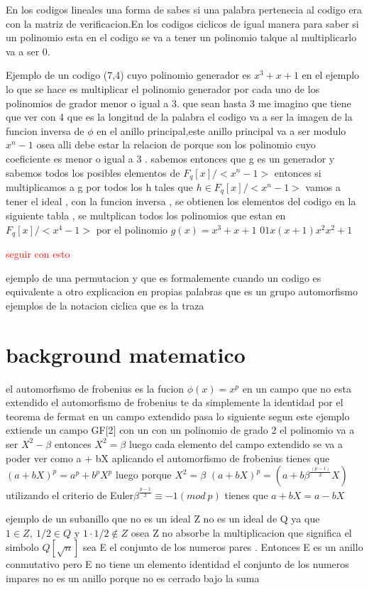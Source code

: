 \documentclass[12p]{article}
\newcommand{\rojo}[1]{
  \textcolor{red}{#1}
}
\begin{document}
En los codigos lineales una forma de sabes si una palabra pertenecia al codigo era con la matriz de 
verificacion.En los codigos ciclicos de igual manera para saber si un polinomio esta en el codigo 
se va a tener un polinomio talque al multiplicarlo va a ser 0.

Ejemplo de un codigo (7,4) cuyo polinomio generador es $x^3 + x + 1$
en el ejemplo lo que se hace es multiplicar el polinomio generador por cada uno de los polinomios de grador menor o igual a 3.
que sean hasta 3 me imagino que tiene que ver con 4 que es la longitud de la palabra
el codigo va a ser la imagen de la funcion inversa de $\phi$ en el anillo principal,este anillo principal va a ser modulo $x^ n - 1$
osea alli debe estar la relacion de porque son los polinomio cuyo coeficiente es menor o igual a 3 .
sabemos entonces que g es un generador y sabemos todos los posibles elementos de $F_q[x]/<x^ n -1>$ entonces si multiplicamos a
g por todos los h tales que $h \in F _ q[x]/<x^ n - 1>$ vamos a tener el ideal , con la funcion inversa , se obtienen los elementos del codigo
en la siguiente tabla , se multplican todos los polinomios que estan en $F_q[x]/<x^ 4 - 1>$ por el polinomio $g(x) = x ^ 3 + x + 1$
$0
1
x
(x + 1)
x^2
x^ 2 + 1$
\rojo{seguir con esto}

ejemplo de una permutacion y que es formalemente
cuando un codigo es equivalente a otro
explicacion en propias palabras que es un grupo automorfismo
ejemplos de la notacion ciclica
que es la traza 
\section{background matematico}
el automorfismo de frobenius es la fucion $\phi(x) = x^p$
en un campo que no esta extendido el automorfismo de frobenius te da
simplemente la identidad por el teorema de fermat
en un campo extendido pasa lo siguiente segun este ejemplo
extiende un campo GF[2] con un con un polinomio de grado 2
el polinomio va a ser $X^2 - \beta$ entonces $X ^ 2 = \beta$ luego
cada elemento del campo extendido se va a poder ver como
a + bX
aplicando el automorfismo de frobenius tienes que
$ (a + bX)^p = a ^ p + b^pX^p$ luego
porque $X^2 = \beta $
$(a + bX)^p = (a + b \beta^{\frac{(p-1)}{2}}X)$
utilizando el criterio de Euler$ \beta^{\frac{p-1}{2}} \equiv -1 (mod \ p)$
tienes que $ a + bX = a - bX $

ejemplo de un subanillo que no es un ideal 
Z no es un ideal de Q ya que $ 1 \in Z , \ 1/2 \in Q  $  y $  1 \cdot 1/2 \not\in Z $ osea Z no absorbe la multiplicacion
que significa el simbolo $Q[\sqrt{n}]$
sea E el conjunto de los numeros pares . Entonces E es un anillo conmutativo pero E no tiene un elemento identidad
el conjunto de los numeros impares no es un anillo porque no es cerrado bajo la suma
\end{document}
